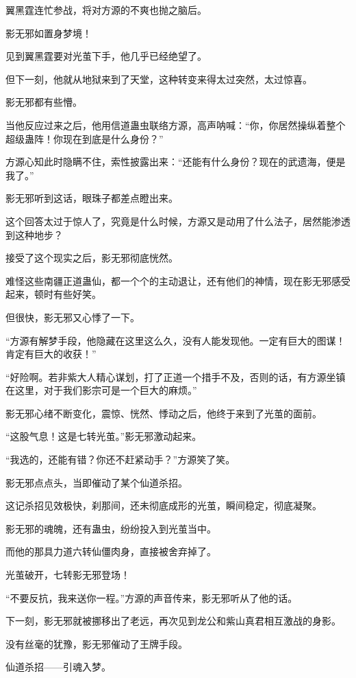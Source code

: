 \begin{this_body}
翼黑霆连忙参战，将对方源的不爽也抛之脑后。

影无邪如置身梦境！

见到翼黑霆要对光茧下手，他几乎已经绝望了。

但下一刻，他就从地狱来到了天堂，这种转变来得太过突然，太过惊喜。

影无邪都有些懵。

当他反应过来之后，他用信道蛊虫联络方源，高声呐喊：“你，你居然操纵着整个超级蛊阵！你现在到底是什么身份？”

方源心知此时隐瞒不住，索性披露出来：“还能有什么身份？现在的武遗海，便是我了。”

影无邪听到这话，眼珠子都差点瞪出来。

这个回答太过于惊人了，究竟是什么时候，方源又是动用了什么法子，居然能渗透到这种地步？

接受了这个现实之后，影无邪彻底恍然。

难怪这些南疆正道蛊仙，都一个个的主动退让，还有他们的神情，现在影无邪感受起来，顿时有些好笑。

但很快，影无邪又心悸了一下。

“方源有解梦手段，他隐藏在这里这么久，没有人能发现他。一定有巨大的图谋！肯定有巨大的收获！”

“好险啊。若非紫大人精心谋划，打了正道一个措手不及，否则的话，有方源坐镇在这里，对于我们影宗可是一个巨大的麻烦。”

影无邪心绪不断变化，震惊、恍然、悸动之后，他终于来到了光茧的面前。

“这股气息！这是七转光茧。”影无邪激动起来。

“我选的，还能有错？你还不赶紧动手？”方源笑了笑。

影无邪点点头，当即催动了某个仙道杀招。

这记杀招见效极快，刹那间，还未彻底成形的光茧，瞬间稳定，彻底凝聚。

影无邪的魂魄，还有蛊虫，纷纷投入到光茧当中。

而他的那具力道六转仙僵肉身，直接被舍弃掉了。

光茧破开，七转影无邪登场！

“不要反抗，我来送你一程。”方源的声音传来，影无邪听从了他的话。

下一刻，影无邪就被挪移出了老远，再次见到龙公和紫山真君相互激战的身影。

没有丝毫的犹豫，影无邪催动了王牌手段。

仙道杀招——引魂入梦。


\end{this_body}
